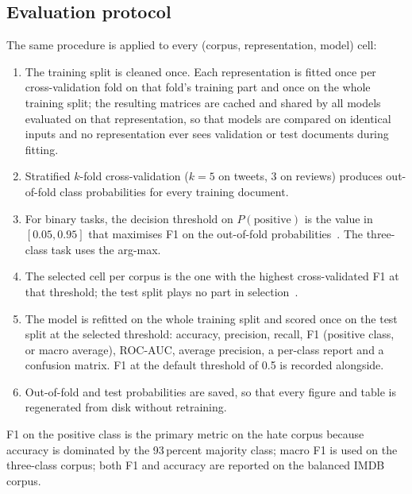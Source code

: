 \documentclass[journal,10pt]{IEEEtran}
\begin{document}
\subsection{Evaluation protocol}
\label{sec:protocol}
The same procedure is applied to every (corpus, representation, model) cell:
\begin{enumerate}
\item The training split is cleaned once. Each representation is fitted once per cross-validation fold on that fold's training part and once on the whole training split; the resulting matrices are cached and shared by all models evaluated on that representation, so that models are compared on identical inputs and no representation ever sees validation or test documents during fitting.
\item Stratified $k$-fold cross-validation ($k{=}5$ on tweets, $3$ on reviews) produces out-of-fold class probabilities for every training document.
\item For binary tasks, the decision threshold on $P(\text{positive})$ is the value in $[0.05, 0.95]$ that maximises F1 on the out-of-fold probabilities~\cite{lipton2014}. The three-class task uses the arg-max.
\item The selected cell per corpus is the one with the highest cross-validated F1 at that threshold; the test split plays no part in selection~\cite{cawley2010}.
\item The model is refitted on the whole training split and scored once on the test split at the selected threshold: accuracy, precision, recall, F1 (positive class, or macro average), ROC-AUC, average precision, a per-class report and a confusion matrix. F1 at the default threshold of 0.5 is recorded alongside.
\item Out-of-fold and test probabilities are saved, so that every figure and table is regenerated from disk without retraining.
\end{enumerate}
F1 on the positive class is the primary metric on the hate corpus because accuracy is dominated by the 93\,percent majority class; macro F1 is used on the three-class corpus; both F1 and accuracy are reported on the balanced IMDB corpus.
\end{document}
